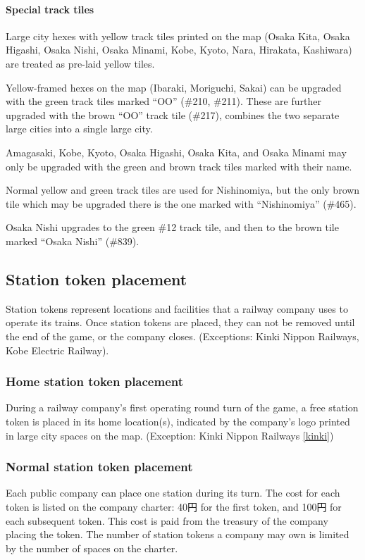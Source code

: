 \documentclass{article}
\begin{document}
\begin{CJK}{UTF8}{min}
\begin{multicols}{2}
\paragraph{Special track tiles}
Large city hexes with yellow track tiles printed on the map (Osaka Kita,
Osaka Higashi, Osaka Nishi, Osaka Minami, Kobe, Kyoto, Nara, Hirakata,
Kashiwara) are treated as pre-laid yellow tiles.

Yellow-framed hexes on the map (Ibaraki, Moriguchi, Sakai) can be
upgraded with the green track tiles marked ``OO'' (\#210, \#211). These
are further upgraded with the brown ``OO'' track tile (\#217), combines
the two separate large cities into a single large city.

Amagasaki, Kobe, Kyoto, Osaka Higashi, Osaka Kita, and Osaka Minami
may only be upgraded with the green and brown track tiles marked with
their name.

Normal yellow and green track tiles are used for Nishinomiya, but the
only brown tile which may be upgraded there is the one marked with
``Nishinomiya'' (\#465).

Osaka Nishi upgrades to the green \#12 track tile, and then to the
brown tile marked ``Osaka Nishi'' (\#839).

\subsection{Station token placement}
Station tokens represent locations and facilities that a railway
company uses to operate its trains. Once station tokens are placed,
they can not be removed until the end of the game, or the company
closes. (Exceptions: Kinki Nippon Railways, Kobe Electric Railway).

\subsubsection{Home station token placement}
\label{or-home-station}
During a railway company's first operating round turn of the game, a
free station token is placed in its home location(s), indicated by the
company's logo printed in large city spaces on the map. (Exception:
Kinki Nippon Railways \ref{kinki})

\subsubsection{Normal station token placement}
Each public company can place one station during its turn. The cost
for each token is listed on the company charter: 40円 for the first
token, and 100円 for each subsequent token. This cost is paid from
the treasury of the company placing the token. The number of station tokens
a company may own is limited by the number of spaces on the charter.


\end{multicols}
\end{CJK}
\end{document}
